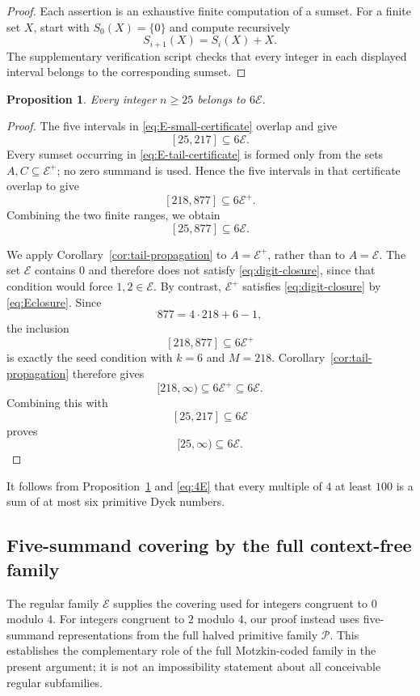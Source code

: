 \documentclass[11pt]{article}
\theoremstyle{plain}
\newtheorem{proposition}[theorem]{Proposition}
\theoremstyle{definition}
\newcommand{\Pset}{\mathcal P}
\begin{document}
\begin{proof}
Each assertion is an exhaustive finite computation of a sumset.  For a
finite set $X$, start with $S_0(X)=\{0\}$ and compute recursively
\[
 S_{i+1}(X)=S_i(X)+X.
\]
The supplementary verification script checks that every integer in each
displayed interval belongs to the corresponding sumset.
\end{proof}

\begin{proposition}\label{prop:E}
Every integer $n\geq25$ belongs to $6\mathcal E$.
\end{proposition}

\begin{proof}
The five intervals in \eqref{eq:E-small-certificate} overlap and give
\[
 [25,217]\subseteq6\mathcal E.
\]
Every sumset occurring in \eqref{eq:E-tail-certificate} is formed only
from the sets $A,C\subseteq\mathcal E^+$; no zero summand is used.
Hence the five intervals in that certificate overlap to give
\[
 [218,877]\subseteq6\mathcal E^+.
\]
Combining the two finite ranges, we obtain
\begin{equation}\label{eq:E-small-cover}
 [25,877]\subseteq6\mathcal E.
\end{equation}

We apply Corollary~\ref{cor:tail-propagation} to
$A=\mathcal E^+$, rather than to $A=\mathcal E$.  The set
$\mathcal E$ contains $0$ and therefore does not satisfy
\eqref{eq:digit-closure}, since that condition would force
$1,2\in\mathcal E$.  By contrast, $\mathcal E^+$ satisfies
\eqref{eq:digit-closure} by \eqref{eq:Eclosure}.  Since
\[
 877=4\cdot218+6-1,
\]
the inclusion
\[
 [218,877]\subseteq6\mathcal E^+
\]
is exactly the seed condition with $k=6$ and $M=218$.
Corollary~\ref{cor:tail-propagation} therefore gives
\[
 [218,\infty)\subseteq6\mathcal E^+\subseteq6\mathcal E.
\]
Combining this with
\[
 [25,217]\subseteq6\mathcal E
\]
proves
\[
 [25,\infty)\subseteq6\mathcal E.
\]
\end{proof}

It follows from Proposition~\ref{prop:E} and \eqref{eq:4E} that every
multiple of $4$ at least $100$ is a sum of at most six primitive Dyck
numbers.

\subsection{Five-summand covering by the full context-free family}

The regular family $\mathcal E$ supplies the covering used for integers
congruent to $0$ modulo $4$.  For integers congruent to $2$ modulo $4$,
our proof instead uses five-summand representations from the full halved
primitive family $\Pset$.  This establishes the complementary role of the
full Motzkin-coded family in the present argument; it is not an
impossibility statement about all conceivable regular subfamilies.
\end{document}
